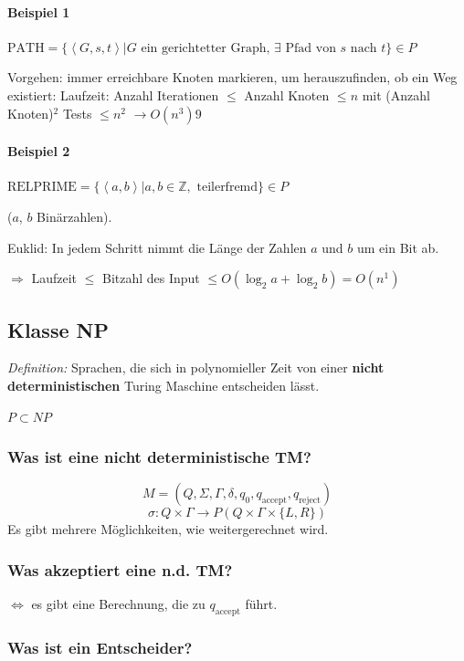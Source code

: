 \paragraph{Beispiel 1} $\text{PATH} = \{ \left< G, s, t \right> | G \text{ ein gerichtetter Graph, } \exists \text{ Pfad von } s \text{ nach } t\} \in P$

Vorgehen: immer erreichbare Knoten markieren, um herauszufinden, ob ein Weg existiert: Laufzeit: Anzahl Iterationen $\leq$ Anzahl Knoten $\leq n$  
mit (Anzahl Knoten)$^2$ Tests $\leq n^2$ $\longrightarrow O(n^3)9$
	
\paragraph{Beispiel 2} $\text{RELPRIME} = \{ \left<a,b\right> | a, b \in \mathbb{Z}, \text{ teilerfremd} \} \in P$

($a$, $b$ Binärzahlen).

Euklid: In jedem Schritt nimmt die Länge der Zahlen $a$ und $b$ um ein Bit ab.

$\Rightarrow$ Laufzeit $\leq$ Bitzahl des Input $\leq O(\log_2{a} + \log_2{b}) = O(n^1)$


\subsection{Klasse NP}

\emph{Definition:} Sprachen, die sich in polynomieller Zeit von einer \textbf{nicht deterministischen} Turing Maschine entscheiden lässt.

$P \subset NP$

\subsubsection{Was ist eine nicht deterministische TM?}
\[
	M= (Q, \Sigma, \Gamma, \delta, q_0, q_\text{accept}, q_\text{reject})
\]
\[
	\sigma: Q \times \Gamma \longrightarrow P(Q \times \Gamma \times \{L,R\})
\]
Es gibt mehrere Möglichkeiten, wie weitergerechnet wird.

\subsubsection{Was akzeptiert eine n.d. TM?}

$\Leftrightarrow$ es gibt eine Berechnung, die zu $q_\text{accept}$ führt.

\subsubsection{Was ist ein Entscheider?}

